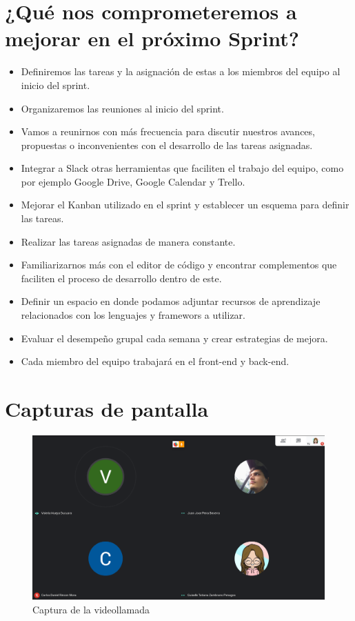 \documentclass[a4paper,10 pt]{article}
\begin{document}
\section{¿Qué nos comprometeremos a mejorar en el próximo Sprint?}

\begin{itemize} 
    \item Definiremos las tareas y la asignación de estas a los miembros
    del equipo al inicio del sprint.
    \item Organizaremos las reuniones al inicio del sprint.
    \item Vamos a reunirnos con más frecuencia para discutir nuestros avances,
    propuestas o inconvenientes con el desarrollo de las tareas asignadas.
    \item Integrar a Slack otras herramientas que faciliten el trabajo del
    equipo, como por ejemplo Google Drive, Google Calendar y Trello.
    \item Mejorar el Kanban utilizado en el sprint y establecer un esquema para
    definir las tareas.
    \item Realizar las tareas asignadas de manera constante.
    \item Familiarizarnos más con el editor de código y encontrar complementos
    que faciliten el proceso de desarrollo dentro de este.
    \item Definir un espacio en donde podamos adjuntar recursos de aprendizaje
    relacionados con los lenguajes y framewors a utilizar.
    \item Evaluar el desempeño grupal cada semana y crear estrategias de
    mejora.
    \item Cada miembro del equipo trabajará en el front-end y back-end.
\end{itemize}{}

\section{Capturas de pantalla}

\begin{figure}[H]
    \centering
    \includegraphics[scale = 0.25]{images/equipo.png}
    \caption{Captura de la videollamada}
    \label{f00}
\end{figure}{}
\end{document}
